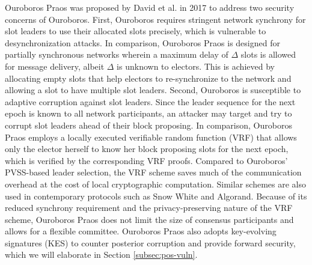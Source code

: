 Ouroboros Praos was proposed by David et al.  in 2017 to address two security concerns of Ouroboros. First, Ouroboros requires stringent network synchrony for slot leaders to use their allocated slots precisely, which is vulnerable to desynchronization attacks. In comparison, Ouroboros Praos is designed for partially synchronous networks wherein a maximum delay of $\Delta$ slots is allowed for message delivery, albeit $\Delta$ is unknown to electors. This is achieved by allocating empty slots that help electors to re-synchronize to the network and allowing a slot to have multiple slot leaders.
Second, Ouroboros is susceptible to adaptive corruption against slot leaders. Since the leader sequence for the next epoch is known to all network participants, an attacker may target and try to corrupt slot leaders ahead of their block proposing. In comparison, Ouroboros Praos employs a locally executed verifiable random function (VRF)  that allows only the elector herself to know her block proposing slots for the next epoch, which is verified by the corresponding VRF proofs. Compared to Ouroboros' PVSS-based leader selection, the VRF scheme saves much of the communication overhead at the cost of local cryptographic computation. Similar schemes are also used in contemporary protocols such as Snow White and Algorand.
Because of its reduced synchrony requirement and the privacy-preserving nature of the VRF scheme, Ouroboros Praos does not limit the size of consensus participants and allows for a flexible committee.
Ouroboros Praos also adopts key-evolving signatures (KES) to counter posterior corruption and provide forward security, which we will elaborate in Section \ref{subsec:pos-vuln}.

